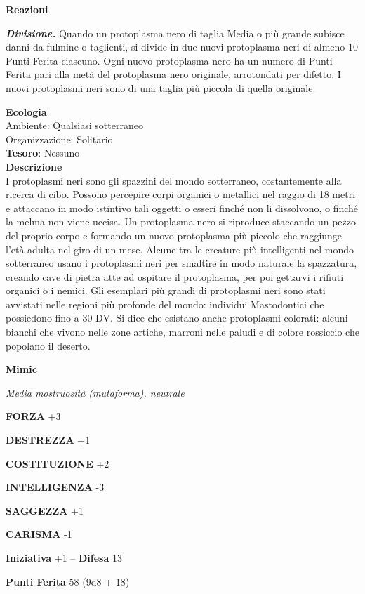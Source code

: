 \begin{multicols}{2}
	\textbf{Reazioni}

	\textit{\textbf{Divisione.}} Quando un protoplasma nero di taglia Media o più grande subisce danni da fulmine o taglienti, si divide in due nuovi protoplasma neri di almeno 10 Punti Ferita ciascuno. Ogni nuovo protoplasma nero ha un numero di Punti Ferita pari alla metà del protoplasma nero originale, arrotondati per difetto. I nuovi protoplasmi neri sono di una taglia più piccola di quella originale.

	\textbf{Ecologia}\\
	Ambiente: Qualsiasi sotterraneo\\
	Organizzazione: Solitario\\
	\textbf{Tesoro}: Nessuno\\
	\textbf{Descrizione}\\
	I protoplasmi neri sono gli spazzini del mondo sotterraneo, costantemente alla ricerca di cibo. Possono percepire corpi organici o metallici nel raggio di 18 metri e attaccano in modo istintivo tali oggetti o esseri finché non li dissolvono, o finché la melma non viene uccisa. Un protoplasma nero si riproduce staccando un pezzo del proprio corpo e formando un nuovo protoplasma più piccolo che raggiunge l'età adulta nel giro di un mese. Alcune tra le creature più intelligenti nel mondo sotterraneo usano i protoplasmi neri per smaltire in modo naturale la spazzatura, creando cave di pietra atte ad ospitare il protoplasma, per poi gettarvi i rifiuti organici o i nemici.
	Gli esemplari più grandi di protoplasmi neri sono stati avvistati nelle regioni più profonde del mondo: individui Mastodontici che possiedono fino a 30 DV. Si dice che esistano anche protoplasmi colorati: alcuni bianchi che vivono nelle zone artiche, marroni nelle paludi e di colore rossiccio che popolano il deserto.


	\medskip{}\textbf{Mimic}

	\textit{Media mostruosità (mutaforma), neutrale}

	\textbf{FORZA} +3

	\textbf{DESTREZZA} +1

	\textbf{COSTITUZIONE} +2

	\textbf{INTELLIGENZA} -3

	\textbf{SAGGEZZA} +1

	\textbf{CARISMA} -1

	\textbf{Iniziativa} +1 -- \textbf{Difesa} 13

	\textbf{Punti Ferita} 58 (9d8 + 18)


\end{multicols}
